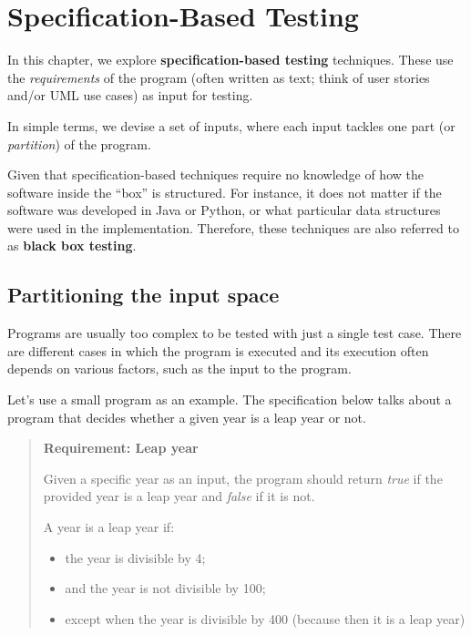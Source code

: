 \hypertarget{specification-based-testing}{%
\section{Specification-Based
Testing}\label{specification-based-testing}}

In this chapter, we explore \textbf{specification-based testing}
techniques. These use the \emph{requirements} of the program (often
written as text; think of user stories and/or UML use cases) as input
for testing.

In simple terms, we devise a set of inputs, where each input tackles one
part (or \emph{partition}) of the program.

Given that specification-based techniques require no knowledge of how
the software inside the ``box'' is structured. For instance, it does not
matter if the software was developed in Java or Python, or what
particular data structures were used in the implementation. Therefore,
these techniques are also referred to as \textbf{black box testing}.

\hypertarget{partitioning-the-input-space}{%
\subsection{Partitioning the input
space}\label{partitioning-the-input-space}}

Programs are usually too complex to be tested with just a single test
case. There are different cases in which the program is executed and its
execution often depends on various factors, such as the input to the
program.

Let's use a small program as an example. The specification below talks
about a program that decides whether a given year is a leap year or not.

\begin{quote}
\textbf{Requirement: Leap year}

Given a specific year as an input, the program should return \emph{true}
if the provided year is a leap year and \emph{false} if it is not.

A year is a leap year if:

\begin{itemize}
\tightlist
\item
  the year is divisible by 4;
\item
  and the year is not divisible by 100;
\item
  except when the year is divisible by 400 (because then it is a leap
  year)
\end{itemize}
\end{quote}

